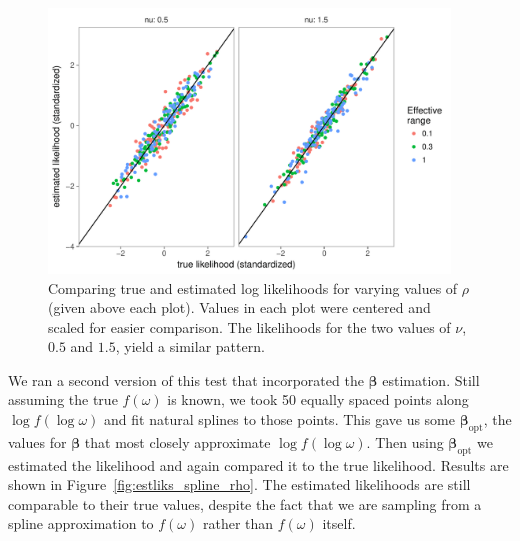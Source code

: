\documentclass[12pt]{article}
\begin{document}
\begin{figure}[!htb]
  \centering
  \includegraphics[width=0.95\textwidth]{lik_true_vs_est.pdf}
  \caption{\small Comparing true and estimated log likelihoods for varying values of $\rho$ (given above each plot). Values in each plot were centered and scaled for easier comparison. The likelihoods for the two values of $\nu$, $0.5$ and $1.5$, yield a similar pattern.}
  \label{fig:liks_by_rho}
\end{figure}


We ran a second version of this test that incorporated the $\bm{\beta}$ estimation. Still assuming the true $f(\omega)$ is known, we took 50 equally spaced points along $\log f(\log \omega)$ and fit natural splines to those points. This gave us some $\bm{\beta}_{\textrm{opt}}$, the values for $\bm{\beta}$ that most closely approximate $\log f(\log \omega)$. Then using $\bm{\beta}_{\textrm{opt}}$ we estimated the likelihood and again compared it to the true likelihood. Results are shown in Figure~\ref{fig:estliks_spline_rho}. The estimated likelihoods are still comparable to their true values, despite the fact that we are sampling from a spline approximation to $f(\omega)$ rather than $f(\omega)$ itself.
\end{document}
